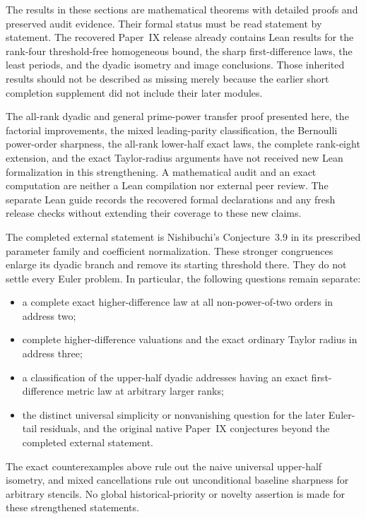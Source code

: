 The results in these sections are mathematical theorems with detailed
proofs and preserved audit evidence. Their formal status must be read
statement by statement. The recovered Paper~IX release already contains
Lean results for the rank-four threshold-free homogeneous bound, the
sharp first-difference laws, the least periods, and the dyadic isometry
and image conclusions. Those inherited results should not be described
as missing merely because the earlier short completion supplement did
not include their later modules.

The all-rank dyadic and general prime-power transfer proof presented
here, the factorial improvements, the mixed leading-parity
classification, the Bernoulli power-order sharpness, the all-rank
lower-half exact laws, the complete rank-eight extension, and the exact
Taylor-radius arguments have not received new Lean formalization in
this strengthening. A mathematical audit and an exact computation are
neither a Lean compilation nor external peer review. The separate Lean
guide records the recovered formal declarations and any fresh release
checks without extending their coverage to these new claims.

The completed external statement is Nishibuchi's Conjecture~3.9 in
its prescribed parameter family and coefficient normalization.
These stronger congruences enlarge its dyadic branch and remove its
starting threshold there. They do not settle every Euler problem.
In particular, the following questions remain separate:
\begin{itemize}
 \item a complete exact higher-difference law at all non-power-of-two
       orders in address two;
 \item complete higher-difference valuations and the exact ordinary
       Taylor radius in address three;
 \item a classification of the upper-half dyadic addresses having an
       exact first-difference metric law at arbitrary larger ranks;
 \item the distinct universal simplicity or nonvanishing question
       for the later Euler-tail residuals, and the original native
       Paper~IX conjectures beyond the completed external statement.
\end{itemize}
The exact counterexamples above rule out the naive universal upper-half
isometry, and mixed cancellations rule out unconditional baseline
sharpness for arbitrary stencils. No global historical-priority or
novelty assertion is made for these strengthened statements.
